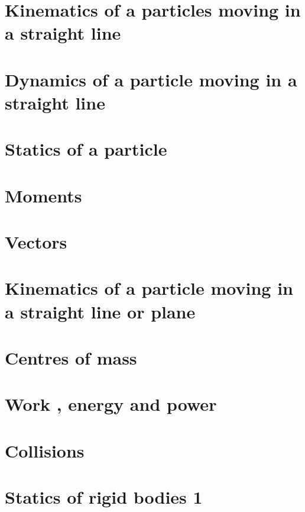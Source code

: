 \documentclass[a4paper]{article}
\begin{document}
\maketitle


\tableofcontents

\section{Kinematics of a particles moving in a straight line}

\section{Dynamics of a particle moving in a straight line}

\section{Statics of a particle}

\section{Moments}

\section{Vectors}

\section{Kinematics of a particle moving in a straight line or plane}

\section{Centres of mass}

\section{Work , energy and power}

\section{Collisions}

\section{Statics of rigid bodies 1}
\end{document}
